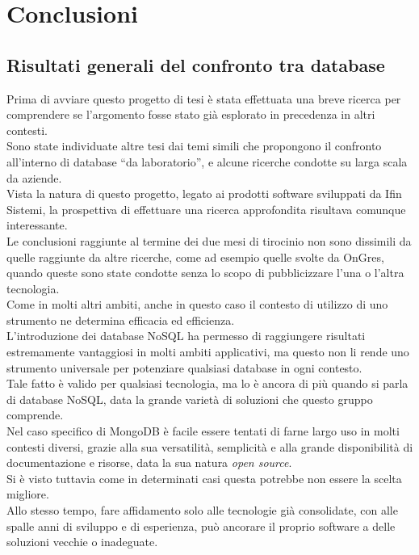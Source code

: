 
\chapter{Conclusioni}
\label{cap:conclusioni}
\section{Risultati generali del confronto tra database}
Prima di avviare questo progetto di tesi è stata effettuata una breve ricerca per comprendere se l'argomento fosse stato già esplorato in precedenza in altri contesti.\\
Sono state individuate altre tesi dai temi simili che propongono il confronto all'interno di database ``da laboratorio'', e alcune ricerche condotte su larga scala da aziende.\\
Vista la natura di questo progetto, legato ai prodotti software sviluppati da Ifin Sistemi, la prospettiva di effettuare una ricerca approfondita risultava comunque interessante.\\

\noindent Le conclusioni raggiunte al termine dei due mesi di tirocinio non sono dissimili da quelle raggiunte da altre ricerche, come ad esempio quelle svolte da OnGres\cite{site:ongres}, quando queste sono state condotte senza lo scopo di pubblicizzare l'una o l'altra tecnologia.\\
Come in molti altri ambiti, anche in questo caso il contesto di utilizzo di uno strumento ne determina efficacia ed efficienza.\\
L'introduzione dei database NoSQL ha permesso di raggiungere risultati estremamente vantaggiosi in molti ambiti applicativi, ma questo non li rende uno strumento universale per potenziare qualsiasi database in ogni contesto.\\
Tale fatto è valido per qualsiasi tecnologia, ma lo è ancora di più quando si parla di database NoSQL, data la grande varietà di soluzioni che questo gruppo comprende.\\
Nel caso specifico di MongoDB è facile essere tentati di farne largo uso in molti contesti diversi, grazie alla sua versatilità, semplicità e alla grande disponibilità di documentazione e risorse, data la sua natura \textit{open source}.\\
Si è visto tuttavia come in determinati casi questa potrebbe non essere la scelta migliore.\\
Allo stesso tempo, fare affidamento solo alle tecnologie già consolidate, con alle spalle anni di sviluppo e di esperienza, può ancorare il proprio software a delle soluzioni vecchie o inadeguate.\\

